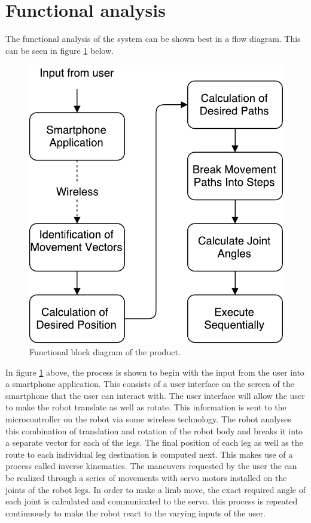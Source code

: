 
\section{Functional analysis}
The functional analysis of the system can be shown best in a flow diagram. This can be seen in figure \ref{fig:Func} below.

\begin{figure}[H]
\centering
\includegraphics[scale=0.8]{FunctionalDiagram.pdf}
\caption{Functional block diagram of the product.}
\label{fig:Func}
\end{figure}

In figure \ref{fig:Func} above, the process is shown to begin with the input from the user into a smartphone application. This consists of a user interface on the screen of the smartphone that the user can interact with. The user interface will allow the user to make the robot translate as well as rotate. This information is sent to the microcontroller on the robot via some wireless technology.
The robot analyses this combination of translation and rotation of the robot body and breaks it into a separate vector for each of the legs. The final position of each leg as well as the route to each individual leg destination is computed next. This makes use of a process called inverse kinematics. The maneuvers requested by the user the can be realized through a series of movements with servo motors installed on the joints of the robot legs. In order to make a limb move, the exact required angle of each joint is calculated and communicated to the servo. this process is repeated continuously to make the robot react to the varying inputs of the user.

\newpage


